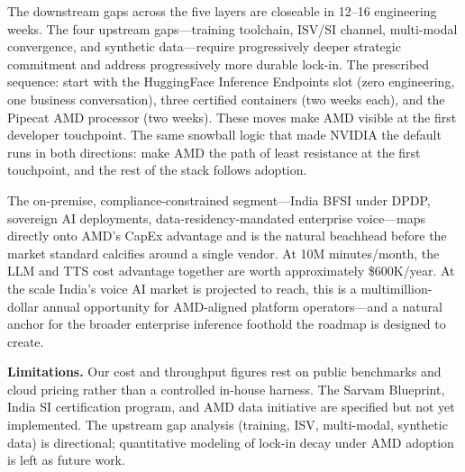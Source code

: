 \documentclass[blind]{gtac}
\begin{document}
The downstream gaps across the five layers are closeable in 12--16 engineering weeks. The four upstream gaps---training toolchain, ISV/SI channel, multi-modal convergence, and synthetic data---require progressively deeper strategic commitment and address progressively more durable lock-in. The prescribed sequence: start with the HuggingFace Inference Endpoints slot (zero engineering, one business conversation), three certified containers (two weeks each), and the Pipecat AMD processor (two weeks). These moves make AMD visible at the first developer touchpoint. The same snowball logic that made NVIDIA the default runs in both directions: make AMD the path of least resistance at the first touchpoint, and the rest of the stack follows adoption.

The on-premise, compliance-constrained segment---India BFSI under DPDP, sovereign AI deployments, data-residency-mandated enterprise voice---maps directly onto AMD's CapEx advantage and is the natural beachhead before the market standard calcifies around a single vendor. At 10M minutes/month, the LLM and TTS cost advantage together are worth approximately \$600K/year. At the scale India's voice AI market is projected to reach, this is a multimillion-dollar annual opportunity for AMD-aligned platform operators---and a natural anchor for the broader enterprise inference foothold the roadmap is designed to create.

\textbf{Limitations.}
Our cost and throughput figures rest on public benchmarks and cloud pricing rather than a controlled in-house harness. The Sarvam Blueprint, India SI certification program, and AMD data initiative are specified but not yet implemented. The upstream gap analysis (training, ISV, multi-modal, synthetic data) is directional; quantitative modeling of lock-in decay under AMD adoption is left as future work.

\begingroup
\let\itshape\upshape


\endgroup
\end{document}
